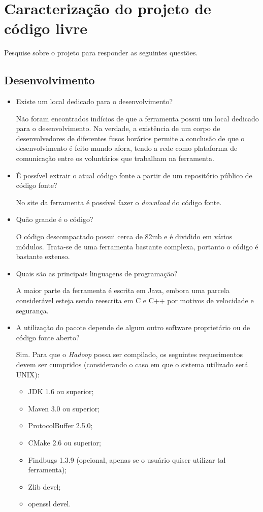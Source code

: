 \documentclass[12pt,a4paper]{article} %
\begin{document}
\section{Caracterização do projeto de código livre} 
Pesquise sobre o projeto para responder as seguintes questões.


\subsection{Desenvolvimento}


\begin{itemize}
\item Existe um local dedicado para o desenvolvimento?

Não foram encontrados indícios de que a ferramenta possui um local dedicado para o desenvolvimento. Na verdade, a existência de um corpo de desenvolvedores de diferentes fusos horários permite a conclusão de que o desenvolvimento é feito mundo afora, tendo a rede como plataforma de comunicação entre os voluntários que trabalham na ferramenta.

\item É possível extrair o atual código fonte a partir de um repositório público de código fonte?

No site da ferramenta é possível fazer o \emph{download} do código fonte.

\item Quão grande é o código?

O código descompactado possui cerca de 82mb e é dividido em vários módulos. Trata-se de uma ferramenta bastante complexa, portanto o código é bastante extenso.

\item Quais são as principais linguagens de programação?

A maior parte da ferramenta é escrita em Java, embora uma parcela considerável esteja sendo reescrita em C e C++ por motivos de velocidade e segurança.

\item A utilização do pacote depende de algum outro software proprietário ou de código fonte aberto?

Sim. Para que o \emph{Hadoop} possa ser compilado, os seguintes requerimentos devem ser cumpridos (considerando o caso em que o sistema utilizado será UNIX):
\begin{itemize}
\item JDK 1.6 ou superior;
\item Maven 3.0 ou superior;
\item ProtocolBuffer 2.5.0;
\item CMake 2.6 ou superior;
\item Findbugs 1.3.9 (opcional, apenas se o usuário quiser utilizar tal ferramenta);
\item Zlib devel;
\item openssl devel.
\end{itemize}


\end{itemize}
\end{document}
